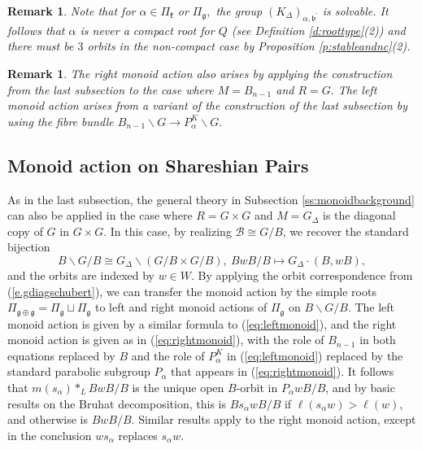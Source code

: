 \documentclass[12pt]{amsart}
\numberwithin{equation}{section}
\newtheorem{rem}[thm]{Remark}
\newcommand{\fk}{\mbox{${\mathfrak k}$}}
\newcommand{\fg}{\mbox{${\mathfrak g}$}}
\newcommand{\fb}{\mbox{${\mathfrak b}$}}
\newcommand{\B}{\mathcal{B}}
\newcommand{\Borbitspace}{B_{n-1}\backslash\B_{n}}
\begin{document}
\begin{rem}\label{r:ncompact}  Note that for $\alpha \in \Pi_{\fk}$ or $\Pi_{\fg},$ the group $(K_{\Delta})_{\alpha,\fb^{\prime}}$ is solvable. It follows  that $\alpha$ is never a compact root for $Q$ (see Definition \ref{d:roottype}(2)) and there must be $3$ orbits in the non-compact case by Proposition \ref{p:stableandnc}(2).
\end{rem}



\begin{rem}\label{r:monoidequiv}
The right monoid action also arises by applying the construction from the last subsection to the case where $M=B_{n-1}$ and $R=G.$   The left monoid action  arises from a variant of the construction of the last subsection by using the fibre bundle $B_{n-1}\backslash G \to P^{K}_{\alpha}\backslash G.$
\end{rem}







\subsection{Monoid action on Shareshian Pairs}\label{ss:Shmonoidact}
As in the last subsection, the general theory in Subsection \ref{ss:monoidbackground} can also be applied in the case where $R=G\times G$ and $M=G_{\Delta}$ is the diagonal copy of $G$ in $G\times G$.  In this case, by realizing $\B\cong G/B$, we recover the standard bijection 
\begin{equation}\label{e.gdiagschubert}
 B\backslash G/B \cong G_{\Delta}\backslash(G/B\times G/B), \ BwB/B \mapsto G_{\Delta}\cdot (B,wB),
\end{equation}
 and the orbits are indexed by $w\in W.$    By applying the orbit correspondence from (\ref{e.gdiagschubert}), we can transfer the monoid action by the simple roots $\Pi_{\fg\oplus\fg}=\Pi_{\fg}\sqcup\Pi_{\fg}$ to left and right monoid actions of $\Pi_{\fg}$  on $B\backslash G/B.$  The left monoid action is given by a similar formula to  (\ref{eq:leftmonoid}), and the right monoid action is given as in (\ref{eq:rightmonoid}), with the role of $B_{n-1}$ in both equations replaced by $B$ and the role of $P^{K}_{\alpha}$ in (\ref{eq:leftmonoid}) replaced by the standard parabolic subgroup $P_{\alpha}$ that appears in (\ref{eq:rightmonoid}).  It follows that $m(s_{\alpha})*_L BwB/B$ is the unique open $B$-orbit in $P_{\alpha} wB/B$, and by basic results on the Bruhat decomposition, this is $Bs_{\alpha} w B/B$ if $\ell(s_{\alpha} w) > \ell(w)$, and otherwise is $BwB/B.$
 Similar results apply to the right monoid action, except in the conclusion $ws_{\alpha}$ replaces $s_{\alpha} w.$ 
\end{document}
